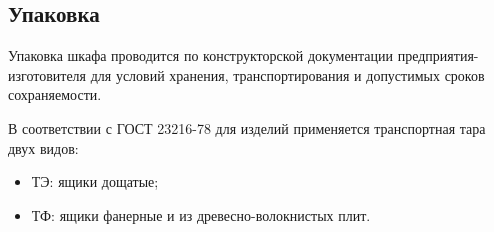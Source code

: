 {\color{unidarkgreen}\subsection{Упаковка}}

\begin{enumsub}
\item Упаковка шкафа проводится по конструкторской документации предприятия-изготовителя для условий хранения, транспортирования и допустимых сроков сохраняемости.
\item В соответствии с ГОСТ 23216-78 для изделий применяется транспортная тара двух видов:
  \begin{itemize}
  \item ТЭ: ящики дощатые;
  \item ТФ: ящики фанерные и из древесно-волокнистых плит.
  \end{itemize}
\end{enumsub}